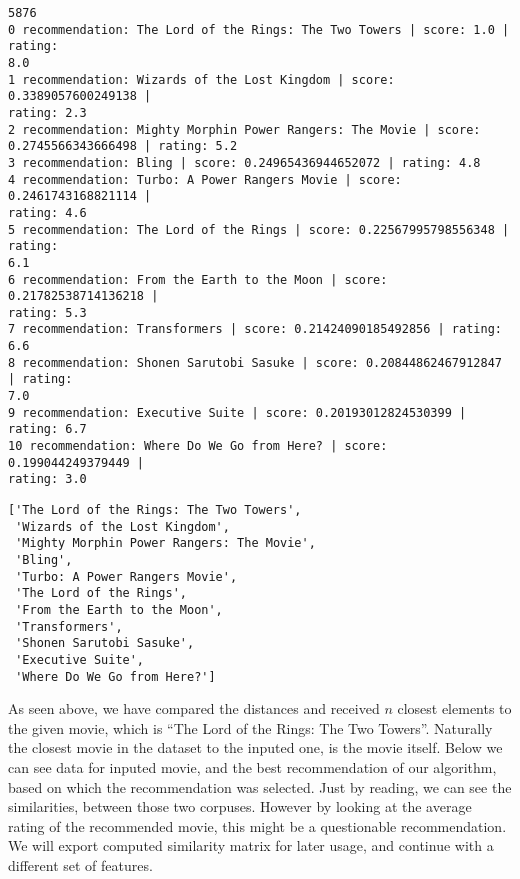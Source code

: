 \documentclass[11pt]{article}
\makeatletter
\newcommand{\boxspacing}{\kern\kvtcb@left@rule\kern\kvtcb@boxsep}
\newcommand{\prompt}[4]{
        {\ttfamily\llap{{\color{#2}[#3]:\hspace{3pt}#4}}\vspace{-\baselineskip}}
    }
\makeatother
\begin{document}
    \begin{Verbatim}[commandchars=\\\{\}]
5876
0 recommendation: The Lord of the Rings: The Two Towers | score: 1.0 | rating:
8.0
1 recommendation: Wizards of the Lost Kingdom | score: 0.3389057600249138 |
rating: 2.3
2 recommendation: Mighty Morphin Power Rangers: The Movie | score:
0.2745566343666498 | rating: 5.2
3 recommendation: Bling | score: 0.24965436944652072 | rating: 4.8
4 recommendation: Turbo: A Power Rangers Movie | score: 0.2461743168821114 |
rating: 4.6
5 recommendation: The Lord of the Rings | score: 0.22567995798556348 | rating:
6.1
6 recommendation: From the Earth to the Moon | score: 0.21782538714136218 |
rating: 5.3
7 recommendation: Transformers | score: 0.21424090185492856 | rating: 6.6
8 recommendation: Shonen Sarutobi Sasuke | score: 0.20844862467912847 | rating:
7.0
9 recommendation: Executive Suite | score: 0.20193012824530399 | rating: 6.7
10 recommendation: Where Do We Go from Here? | score: 0.199044249379449 |
rating: 3.0
    \end{Verbatim}

            \begin{tcolorbox}[breakable, size=fbox, boxrule=.5pt, pad at break*=1mm, opacityfill=0]
\prompt{Out}{outcolor}{14}{\boxspacing}
\begin{Verbatim}[commandchars=\\\{\}]
['The Lord of the Rings: The Two Towers',
 'Wizards of the Lost Kingdom',
 'Mighty Morphin Power Rangers: The Movie',
 'Bling',
 'Turbo: A Power Rangers Movie',
 'The Lord of the Rings',
 'From the Earth to the Moon',
 'Transformers',
 'Shonen Sarutobi Sasuke',
 'Executive Suite',
 'Where Do We Go from Here?']
\end{Verbatim}
\end{tcolorbox}
        
    As seen above, we have compared the distances and received \(n\) closest
elements to the given movie, which is ``The Lord of the Rings: The Two
Towers''. Naturally the closest movie in the dataset to the inputed one,
is the movie itself. Below we can see data for inputed movie, and the
best recommendation of our algorithm, based on which the recommendation
was selected. Just by reading, we can see the similarities, between
those two corpuses. However by looking at the average rating of the
recommended movie, this might be a questionable recommendation. We will
export computed similarity matrix for later usage, and continue with a
different set of features.
\end{document}
